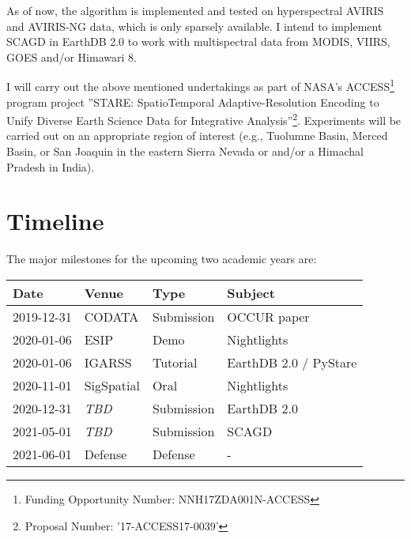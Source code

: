 \documentclass[letterpaper, parskip=half]{scrartcl}
\begin{document}
 
As of now, the algorithm is implemented and tested on hyperspectral \gls{AVIRIS} and \gls{AVIRIS-NG} data, which is only sparsely available. I intend to implement \gls{SCAGD} in EarthDB 2.0 to work with multispectral data from \gls{MODIS}, \gls{VIIRS}, \gls{GOES} and/or Himawari 8.

I will carry out the above mentioned undertakings as part of NASA's \gls{ACCESS}\footnote{Funding Opportunity Number: NNH17ZDA001N-ACCESS} program project ''STARE: SpatioTemporal Adaptive-Resolution Encoding to Unify Diverse Earth Science Data for Integrative Analysis''\footnote{Proposal Number: '17-ACCESS17-0039'}. Experiments will be carried out on an appropriate region of interest (e.g., Tuolumne Basin, Merced Basin, or San Joaquin in the eastern Sierra Nevada or and/or a Himachal Pradesh in India). 


\newpage
\section{Timeline}

The major milestones for the upcoming two academic years are:

\begin{table}[ht]
 \centering


\begin{tabular}{l l l l}
\toprule
    Date        & Venue            & Type       & Subject                           \\ \midrule
    2019-12-31  & CODATA           & Submission & OCCUR paper                       \\
    2020-01-06  & ESIP             & Demo       & Nightlights 	                    \\
    2020-01-06  & IGARSS           & Tutorial   & EarthDB 2.0 / PyStare             \\
    2020-11-01  & SigSpatial	   & Oral       & Nightlights 	                    \\
    2020-12-31  & \textit{TBD}              & Submission & EarthDB 2.0                       \\
    2021-05-01  & \textit{TBD}              & Submission & SCAGD                             \\
    2021-06-01  & Defense	       & Defense    &  -                                \\
\bottomrule
    
    
\end{tabular}
\end{table}
\end{document}
